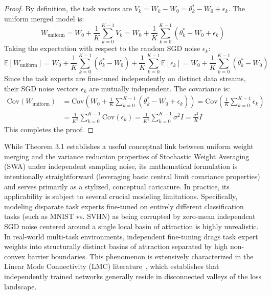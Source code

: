 \begin{proof}
By definition, the task vectors are $V_k = W_k - W_0 = \theta_k^* - W_0 + \epsilon_k$. The uniform merged model is:
\begin{equation}
W_{\text{uniform}} = W_0 + \frac{1}{K} \sum_{k=0}^{K-1} V_k = W_0 + \frac{1}{K} \sum_{k=0}^{K-1} (\theta_k^* - W_0 + \epsilon_k)
\end{equation}
Taking the expectation with respect to the random SGD noise $\epsilon_k$:
\begin{equation}
\mathbb{E}[W_{\text{uniform}}] = W_0 + \frac{1}{K} \sum_{k=0}^{K-1} (\theta_k^* - W_0) + \frac{1}{K} \sum_{k=0}^{K-1} \mathbb{E}[\epsilon_k] = W_0 + \frac{1}{K} \sum_{k=0}^{K-1} (\theta_k^* - W_0)
\end{equation}
Since the task experts are fine-tuned independently on distinct data streams, their SGD noise vectors $\epsilon_k$ are mutually independent. The covariance is:
\begin{align}
\mathrm{Cov}\left(W_{\text{uniform}}\right) &= \mathrm{Cov}\left(W_0 + \frac{1}{K} \sum_{k=0}^{K-1} (\theta_k^* - W_0 + \epsilon_k)\right) = \mathrm{Cov}\left(\frac{1}{K} \sum_{k=0}^{K-1} \epsilon_k\right) \\
&= \frac{1}{K^2} \sum_{k=0}^{K-1} \mathrm{Cov}(\epsilon_k) = \frac{1}{K^2} \sum_{k=0}^{K-1} \sigma^2 I = \frac{\sigma^2}{K} I
\end{align}
This completes the proof.
\end{proof}

While Theorem 3.1 establishes a useful conceptual link between uniform weight merging and the variance reduction properties of Stochastic Weight Averaging (SWA) under independent sampling noise, its mathematical formulation is intentionally straightforward (leveraging basic central limit covariance properties) and serves primarily as a stylized, conceptual caricature. In practice, its applicability is subject to several crucial modeling limitations. Specifically, modeling disparate task experts fine-tuned on entirely different classification tasks (such as MNIST vs. SVHN) as being corrupted by zero-mean independent SGD noise centered around a single local basin of attraction is highly unrealistic. In real-world multi-task environments, independent fine-tuning drags task expert weights into structurally distinct basins of attraction separated by high non-convex barrier boundaries. This phenomenon is extensively characterized in the Linear Mode Connectivity (LMC) literature~\cite{frankle2020linear, entezari2021role}, which establishes that independently trained networks generally reside in disconnected valleys of the loss landscape. 

